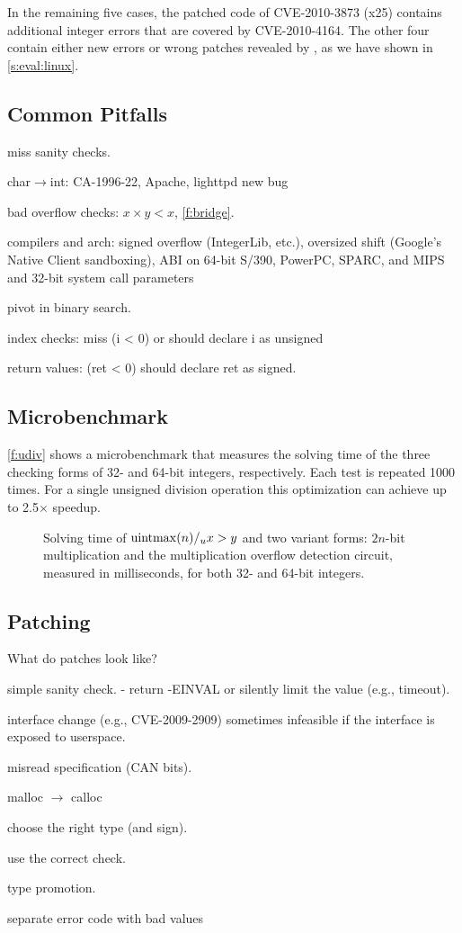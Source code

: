 In the remaining five cases, the patched code of CVE-2010-3873 (x25)
contains additional integer errors that are covered by CVE-2010-4164.
The other four contain either new errors or wrong patches revealed
by \sys, as we have shown in \autoref{s:eval:linux}.

\subsection{Common Pitfalls}
\label{s:eval:common}

miss sanity checks.

char$\to$int: 
CA-1996-22,
Apache,
lighttpd new bug

bad overflow checks: $x \times y < x$, 
\autoref{f:bridge}.

compilers and arch:
signed overflow (IntegerLib, etc.),
oversized shift (Google's Native Client sandboxing),
ABI on 64-bit S/390, PowerPC, SPARC, and MIPS
and 32-bit system call parameters~\cite[CVE-2009-0029]{cve}

pivot in binary search.

index checks:
miss (i < 0) or should declare i as unsigned

return values: (ret < 0)
should declare ret as signed.

\subsection{Microbenchmark}
\label{s:eval:micro}

\autoref{f:udiv} shows a microbenchmark that measures the solving
time of the three checking forms of 32- and 64-bit integers,
respectively.  Each test is repeated 1000 times.  For a single
unsigned division operation this optimization can achieve up to
2.5$\times$ speedup.

\begin{figure}
\centering

\caption{Solving time of $\operatorname{uintmax}(n) /_u x > y$ and two variant
forms: $2n$-bit multiplication and the multiplication overflow
detection circuit, measured in milliseconds, for both 32- and 64-bit
integers.}
\label{f:udiv}
\end{figure}

\subsection{Patching}

What do patches look like?

simple sanity check.
- return -EINVAL or silently limit the value (e.g., timeout).

interface change (e.g., CVE-2009-2909)
sometimes infeasible if the interface is exposed to userspace.

misread specification (CAN bits).

malloc $\to$ calloc

choose the right type (and sign).

use the correct check.

type promotion.

separate error code with bad values
